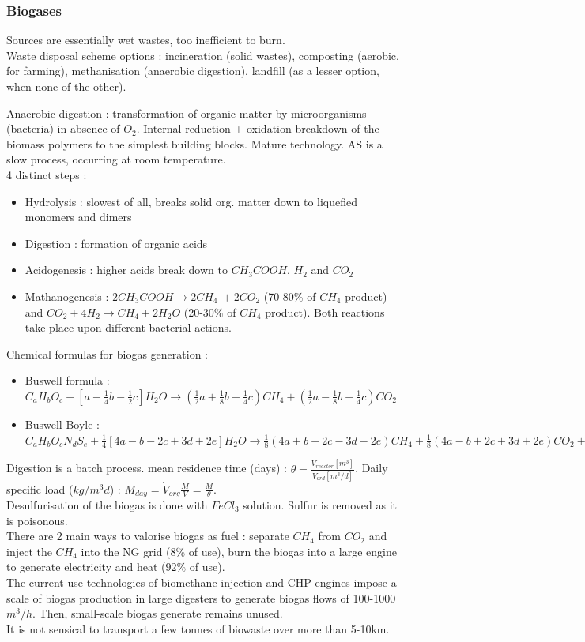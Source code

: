 \documentclass[../main.tex]{subfiles}
\begin{document}
\subsubsection{Biogases}
Sources are essentially wet wastes, too inefficient to burn. \\
Waste disposal scheme options : incineration (solid wastes), composting (aerobic, for farming), methanisation (anaerobic digestion), landfill (as a lesser option, when none of the other). 

Anaerobic digestion : transformation of organic matter by microorganisms (bacteria) in absence of $O_2$. Internal reduction + oxidation breakdown of the biomass polymers to the simplest building blocks. Mature technology. AS is a slow process, occurring at room temperature. \\
4 distinct steps : \begin{itemize}
    \item Hydrolysis : slowest of all, breaks solid org. matter down to liquefied monomers and dimers
    \item Digestion : formation of organic acids
    \item Acidogenesis : higher acids break down to $CH_3 COOH$, $H_2$ and $CO_2$
    \item Mathanogenesis : $2CH_3COOH \rightarrow 2CH_4\: +2CO_2$ (70-80\% of $CH_4$ product) and $CO_2+4H_2 \rightarrow CH_4 + 2H_2O$ (20-30\% of $CH_4$ product). Both reactions take place upon different bacterial actions. 
\end{itemize}

Chemical formulas for biogas generation : \begin{itemize}
    \item Buswell formula : $C_aH_b O_c + [a-\frac{1}{4} b-\frac{1}{2} c] H_2O \rightarrow (\frac{1}{2}a + \frac{1}{8}b - \frac{1}{4}c) CH_4 + (\frac{1}{2}a-\frac{1}{8}b + \frac{1}{4}c) CO_2$
    \item Buswell-Boyle : $C_aH_b O_c N_d S_e + \frac{1}{4}[4a- b- 2c + 3d + 2e] H_2O \rightarrow \frac{1}{8}(4a + b - 2c -3d -2e) CH_4 + \frac{1}{8}(4a-b + 2c +3d + 2e) CO_2 + dNH_3 + eH_2S$
\end{itemize}

Digestion is a batch process. mean residence time (days) : $\theta = \frac{V_{reactor}[m^3]}{\dot{V}_{ord}[m^3/d]}$. Daily specific load ($kg/m^3d$) : $M_{day} = \dot{V}_{org} \frac{M}{V} = \frac{M}{\theta}$.\\
Desulfurisation of the biogas is done with $FeCl_3$ solution. Sulfur is removed as it is poisonous. \\
There are 2 main ways to valorise biogas as fuel : separate $CH_4$ from $CO_2$ and inject the $CH_4$ into the NG grid (8\% of use), burn the biogas into a large engine to generate electricity and heat ($92\%$ of use). \\
The current use technologies of biomethane injection and CHP engines impose a scale of biogas production in large digesters to generate biogas flows of 100-1000$m^3/h$. Then, small-scale biogas generate remains unused. \\
It is not sensical to transport a few tonnes of biowaste over more than 5-10km.\\
\end{document}
